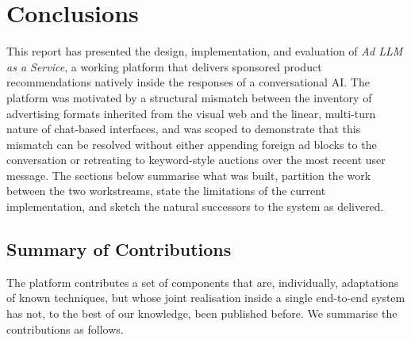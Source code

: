 \section{Conclusions}
\label{sec:conclusions}

This report has presented the design, implementation, and evaluation of
\textit{Ad LLM as a Service}, a working platform that delivers
sponsored product recommendations natively inside the responses of a
conversational AI. The platform was motivated by a structural mismatch
between the inventory of advertising formats inherited from the visual
web and the linear, multi-turn nature of chat-based interfaces, and
was scoped to demonstrate that this mismatch can be resolved without
either appending foreign ad blocks to the conversation or retreating
to keyword-style auctions over the most recent user message. The
sections below summarise what was built, partition the work between
the two workstreams, state the limitations of the current
implementation, and sketch the natural successors to the system as
delivered.

\subsection{Summary of Contributions}
\label{subsec:summary-contributions}

The platform contributes a set of components that are, individually,
adaptations of known techniques, but whose joint realisation inside a
single end-to-end system has not, to the best of our knowledge, been
published before. We summarise the contributions as follows.

